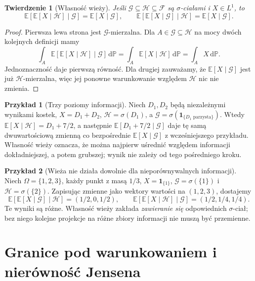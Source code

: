 \documentclass[11pt,a4paper,oneside]{report}
\numberwithin{equation}{chapter}
\theoremstyle{plain}
\newtheorem{twierdzenie}{Twierdzenie}[chapter]
\theoremstyle{definition}
\newtheorem{przyklad}{Przykład}[chapter]
\theoremstyle{remark}
\newcommand{\Prob}{\mathbb{P}}
\newcommand{\E}{\mathbb{E}}
\newcommand{\ind}[1]{\mathbf{1}_{#1}}
\newcommand{\dd}{\mathrm{d}}
\begin{document}
\begin{twierdzenie}[Własność wieży]
Jeśli $\mathcal G\subseteq\mathcal H\subseteq\mathcal F$
są $\sigma$-ciałami i $X\in L^1$, to
\[
\E[\E[X\mid\mathcal H]\mid\mathcal G]
=\E[X\mid\mathcal G],
\qquad
\E[\E[X\mid\mathcal G]\mid\mathcal H]
=\E[X\mid\mathcal G].
\]
\end{twierdzenie}
\begin{proof}
Pierwsza lewa strona jest $\mathcal G$-mierzalna.
Dla $A\in\mathcal G\subseteq\mathcal H$
na mocy dwóch kolejnych definicji mamy
\[
\int_A \E[\E[X\mid\mathcal H]\mid\mathcal G]
\,\dd\Prob
=\int_A\E[X\mid\mathcal H]\,\dd\Prob
=\int_A X\,\dd\Prob.
\]
Jednoznaczność daje pierwszą równość.
Dla drugiej zauważamy, że $\E[X\mid\mathcal G]$
jest już $\mathcal H$-mierzalna, więc jej ponowne
warunkowanie względem $\mathcal H$ nic nie zmienia.
\end{proof}

\begin{przyklad}[Trzy poziomy informacji]
Niech $D_1,D_2$ będą niezależnymi wynikami kostek,
$X=D_1+D_2$, $\mathcal H=\sigma(D_1)$,
a $\mathcal G=\sigma(\ind{\{D_1\text{ parzysta}\}})$.
Wtedy
$\E[X\mid\mathcal H]=D_1+7/2$,
a następnie $\E[D_1+7/2\mid\mathcal G]$
daje tę samą dwuwartościową zmienną co
bezpośrednie $\E[X\mid\mathcal G]$ z wcześniejszego
przykładu. Własność wieży oznacza, że można
najpierw uśrednić względem informacji dokładniejszej,
a potem grubszej; wynik nie zależy od tego
pośredniego kroku.
\end{przyklad}

\begin{przyklad}[Wieża nie działa dowolnie dla nieporównywalnych informacji]
Niech $\Omega=\{1,2,3\}$, każdy punkt z masą $1/3$,
$X=\ind{\{1\}}$, $\mathcal G=\sigma(\{1\})$
i $\mathcal H=\sigma(\{2\})$.
Zapisując zmienne jako wektory wartości na
$(1,2,3)$, dostajemy
\[
\E[\E[X\mid\mathcal G]\mid\mathcal H]
=(1/2,0,1/2),\qquad
\E[\E[X\mid\mathcal H]\mid\mathcal G]
=(1/2,1/4,1/4).
\]
Te wyniki są różne. Własność wieży zakłada
\emph{zawieranie się} odpowiednich $\sigma$-ciał;
bez niego kolejne projekcje na różne zbiory
informacji nie muszą być przemienne.
\end{przyklad}

\section{Granice pod warunkowaniem i nierówność Jensena}
\end{document}
